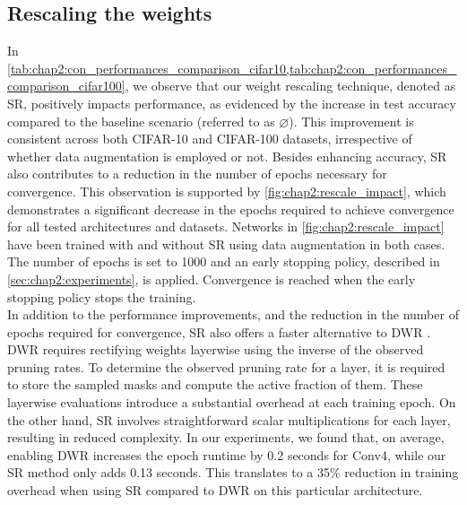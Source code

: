 
\subsection{Rescaling the weights}

In
\cref{tab:chap2:con_performances_comparison_cifar10,tab:chap2:con_performances_comparison_cifar100},
we observe that our weight rescaling technique, denoted as \acf{SR}, positively
impacts performance, as evidenced by the increase in test accuracy compared to
the baseline scenario (referred to as $\varnothing$). This improvement is
consistent across both CIFAR-10 and CIFAR-100 datasets, irrespective of whether
data augmentation is employed or not. Besides enhancing accuracy, \ac{SR} also
contributes to a reduction in the number of epochs necessary for convergence.
This observation is supported by \cref{fig:chap2:rescale_impact}, which
demonstrates a significant decrease in the epochs required to achieve
convergence for all tested architectures and datasets. Networks in
\cref{fig:chap2:rescale_impact} have been trained with and without \ac{SR} using
data augmentation in both cases. The number of epochs is set to 1000 and an early
stopping policy, described in \cref{sec:chap2:experiments}, is applied.
Convergence is reached when the early stopping policy stops the training.\\

In addition to the performance improvements, and the reduction in the number of
epochs required for convergence, \ac{SR} also offers a faster alternative to
\acf{DWR} \cite{DBLP:conf/nips/ZhouLLY19}. DWR requires rectifying weights
layerwise using the inverse of the observed pruning rates. To determine the
observed pruning rate for a layer, it is required to store the sampled masks and
compute the active fraction of them. These layerwise evaluations introduce a
substantial overhead at each training epoch. On the other hand, \ac{SR} involves
straightforward scalar multiplications for each layer, resulting in reduced
complexity. In our experiments, we found that, on average, enabling \ac{DWR}
increases the epoch runtime by 0.2 seconds for Conv4, while our \ac{SR} method
only adds 0.13 seconds. This translates to a 35\% reduction in training overhead
when using \ac{SR} compared to \ac{DWR} on this particular architecture.\\

